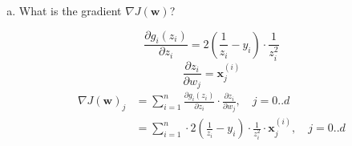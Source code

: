 \documentclass[11pt]{article}
\newcommand{\wbf}{\mathbf{w}}
\newcommand{\xbf}{\mathbf{x}}
\begin{document}
\begin{enumerate}
\begin{enumerate}[(a)]
\item What is the gradient $\nabla J(\wbf)$?


\[
	\frac{\partial g_i(z_i)}{\partial z_i} = 2 \left( \frac{1}{z_i} - y_i \right) 
    	\cdot \frac{1}{z_i^2}
\]
\[
	\frac{\partial z_i}{\partial w_j} = \xbf^{(i)}_j
\]
\begin{align*}
	\nabla J(\wbf)_j &= \sum_{i=1}^n \frac{\partial g_i(z_i)}{\partial z_i} \cdot 
    	\frac{\partial z_i}{\partial w_j}, \quad j=0..d \\
	&= \sum_{i=1}^n  \cdot 2 \left( \frac{1}{z_i} - y_i \right) 
    	\cdot \frac{1}{z_i^2} \cdot
    	\xbf^{(i)}_j, \quad j=0..d \\
\end{align*}


\end{enumerate}
\end{enumerate}
\end{document}
